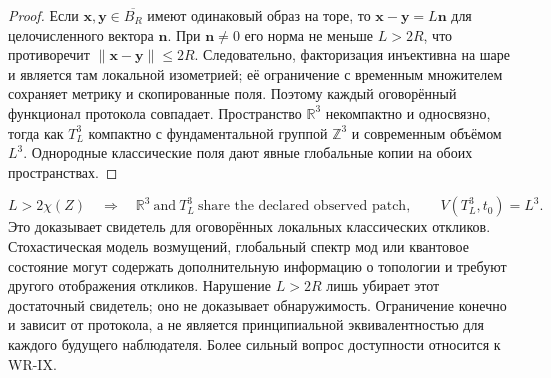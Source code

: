 \begin{proof}
{Если $\mathbf x,\mathbf y\in\overline{B_R}$ имеют одинаковый образ на торе, то $\mathbf x-\mathbf y=L\mathbf n$ для целочисленного вектора $\mathbf n$. При $\mathbf n\ne0$ его норма не меньше $L>2R$, что противоречит $\|\mathbf x-\mathbf y\|\leq2R$. Следовательно, факторизация инъективна на шаре и является там локальной изометрией; её ограничение с временным множителем сохраняет метрику и скопированные поля. Поэтому каждый оговорённый функционал протокола совпадает. Пространство $\mathbb R^3$ некомпактно и односвязно, тогда как $T_L^3$ компактно с фундаментальной группой $\mathbb Z^3$ и современным объёмом $L^3$. Однородные классические поля дают явные глобальные копии на обоих пространствах.}
\end{proof}
\begin{equation}\label{eq:topology}
 L>2\chi(Z)\quad\Longrightarrow\quad
 \mathbb R^3\ \text{and}\ T_L^3\ \text{share the declared observed patch},\qquad
 V(T_L^3,t_0)=L^3.
\end{equation}
{Это доказывает свидетель для оговорённых локальных классических откликов. Стохастическая модель возмущений, глобальный спектр мод или квантовое состояние могут содержать дополнительную информацию о топологии и требуют другого отображения откликов. Нарушение $L>2R$ лишь убирает этот достаточный свидетель; оно не доказывает обнаружимость. Ограничение конечно и зависит от протокола, а не является принципиальной эквивалентностью для каждого будущего наблюдателя. Более сильный вопрос доступности относится к WR-IX.}
